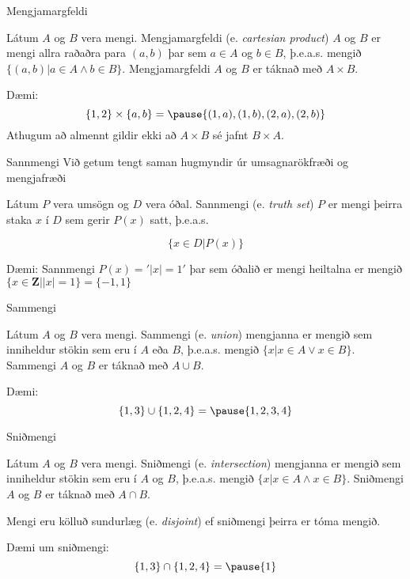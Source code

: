 \documentclass{beamer}
\begin{document}
\begin{frame}{Mengjamargfeldi}
\begin{tcolorbox}[title=Mengjamargfeldi]
Látum $A$ og $B$ vera mengi. Mengjamargfeldi (e. \emph{cartesian product}) $A$ og $B$ er mengi allra raðaðra para $(a, b)$ þar sem $a \in A$ og $b \in B$, þ.e.a.s. mengið $\{(a, b) | a \in A \land b \in B\}$. Mengjamargfeldi $A$ og $B$ er táknað með $A \times B$.
\end{tcolorbox}
Dæmi:
\[
 \{1, 2\} \times \{a, b\} = \pause \{(1, a), (1, b), (2, a), (2, b)\}
\]
Athugum að almennt gildir ekki að $A \times B$ sé jafnt $B \times A$.
\end{frame}

\begin{frame}{Sannmengi}
    Við getum tengt saman hugmyndir úr umsagnarökfræði og mengjafræði
    \begin{tcolorbox}[title=Sannmengi]
        Látum $P$ vera umsögn og $D$ vera óðal. Sannmengi (e. \emph{truth set}) $P$ er mengi þeirra staka $x$ í $D$ sem gerir $P(x)$ satt, þ.e.a.s.

        \[
            \{x \in D | P(x)\}
        \]
    \end{tcolorbox}

    Dæmi: Sannmengi $P(x) = '|x| = 1'$ þar sem óðalið er mengi heiltalna er mengið $\{x \in \mathbf{Z} | |x|=1\} = $\pause $\{-1,1\}$
\end{frame}

\begin{frame}{Sammengi}
\begin{tcolorbox}[title=Sammengi]
Látum $A$ og $B$ vera mengi. 
Sammengi (e. \emph{union}) mengjanna er mengið sem inniheldur stökin sem eru í $A$ eða $B$, 
þ.e.a.s. mengið $\{x | x \in A \lor x \in B \}$. 
Sammengi $A$ og $B$ er táknað með $A\cup B$.
\end{tcolorbox}
Dæmi:
\[
 \{1, 3\} \cup \{1, 2, 4\} = \pause \{1, 2, 3, 4\}
\]
\end{frame}

\begin{frame}{Sniðmengi}
\begin{tcolorbox}[title=Sniðmengi]
Látum $A$ og $B$ vera mengi.
Sniðmengi (e. \emph{intersection}) mengjanna er mengið sem inniheldur stökin sem eru í $A$ og $B$, 
þ.e.a.s. mengið $\{x | x \in A \land x \in B \}$. 
Sniðmengi $A$ og $B$ er táknað með $A\cap B$.
\end{tcolorbox}
Mengi eru kölluð sundurlæg (e. \emph{disjoint}) ef sniðmengi þeirra er tóma mengið.

Dæmi um sniðmengi:
\[
 \{1, 3\} \cap \{1, 2, 4\} = \pause \{1\}
\]
\end{frame}
\end{document}

